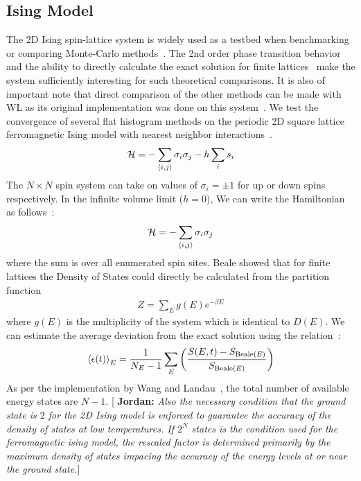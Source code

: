 \documentclass[letterpaper,twocolumn,amsmath,amssymb,pre,aps,10pt]{revtex4-1}
\newcommand{\blue}[1]{{\bf \color{blue} #1}}
\newcommand{\jpsays}[1]{{\color{red} [\blue{Jordan:} \emph{#1}]}}
\begin{document}
\subsection{Ising Model}
The 2D Ising spin-lattice system is widely used as a testbed when
benchmarking or comparing Monte-Carlo
methods~\cite{ferdinand1969bounded, wang1999transition}. The 2nd order
phase transition behavior and the ability to directly calculate the
exact solution for finite lattices~\cite{beale1996exact} make the
system sufficiently interesting for such theoretical comparisons. It is
also of important note that direct comparison of the other methods can
be made with WL as its original implementation was done on this
system~\cite{wang2001determining,wang2001efficient}.
We test the convergence of several flat histogram methods
on the periodic 2D square lattice ferromagnetic Ising model with nearest
neighbor interactions~\cite{landau2004new}.
\begin{align}
\mathcal{H} = -\sum_{\braket{i,j}} \sigma_i \sigma_j - h \sum_i s_i
\end{align}
The $N\times N$ spin system can take on values of $\sigma_i = \pm 1$
for up or down spins respectively. In the infinite volume limit ($h =
0$), We can write the Hamiltonian as follows~\cite{onsager1944crystal,
kaufman1949crystal}:
\begin{align}
\mathcal{H} = -\sum_{\braket{i,j}} \sigma_i \sigma_j
\end{align}
where the sum is over all enumerated spin sites. Beale showed that for finite
lattices the Density of States could directly be calculated from the partition
function~\cite{beale1996exact}
\begin{align}
Z = \sum_E g(E) e^{-{\beta E}}
\end{align}
where $g(E)$ is the multiplicity of the system which is identical to
$D(E)$. We can estimate the average deviation from the exact solution
using the relation~\cite{schneider2017convergence, shakirov2018convergence,
barash2017control}:
\begin{align}
\braket{\epsilon(t)}_E = \frac{1}{N_E - 1} \sum_E \left( \frac{S(E,t) - S_{\text{Beale}(E)}}{S_{\text{Beale}(E)}} \right)
\end{align}
As per the implementation by Wang and
Landau~\cite{wang2001determining}, the total number of available energy
states are $N-1$.
\jpsays{Also the necessary condition that the ground state is
$2$ for the 2D Ising model is enforced to guarantee the accuracy of the
density of states at low temperatures. If $2^N$ states is the condition
used for the ferromagnetic ising model, the rescaled factor is
determined primarily by the maximum density of states impacing the
accuracy of the energy levels at or near the ground state.}
\end{document}
